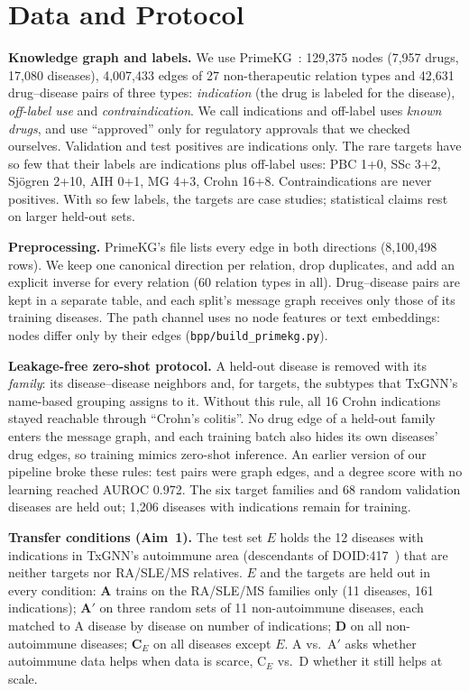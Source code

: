 \documentclass[conference]{IEEEtran}
\begin{document}
\section{Data and Protocol}
\textbf{Knowledge graph and labels.} We use PrimeKG~\cite{chandak2023primekg}: 129,375 nodes (7,957 drugs, 17,080 diseases), 4,007,433 edges of 27 non-therapeutic relation types and 42,631 drug--disease pairs of three types: \emph{indication} (the drug is labeled for the disease), \emph{off-label use} and \emph{contraindication}. We call indications and off-label uses \emph{known drugs}, and use ``approved'' only for regulatory approvals that we checked ourselves. Validation and test positives are indications only. The rare targets have so few that their labels are indications plus off-label uses: PBC 1+0, SSc 3+2, Sj\"ogren 2+10, AIH 0+1, MG 4+3, Crohn 16+8. Contraindications are never positives. With so few labels, the targets are case studies; statistical claims rest on larger held-out sets.

\textbf{Preprocessing.} PrimeKG's file lists every edge in both directions (8,100,498 rows). We keep one canonical direction per relation, drop duplicates, and add an explicit inverse for every relation (60 relation types in all). Drug--disease pairs are kept in a separate table, and each split's message graph receives only those of its training diseases. The path channel uses no node features or text embeddings: nodes differ only by their edges (\texttt{bpp/build\_primekg.py}).

\textbf{Leakage-free zero-shot protocol.} A held-out disease is removed with its \emph{family}: its disease--disease neighbors and, for targets, the subtypes that TxGNN's name-based grouping assigns to it. Without this rule, all 16 Crohn indications stayed reachable through ``Crohn's colitis''. No drug edge of a held-out family enters the message graph, and each training batch also hides its own diseases' drug edges, so training mimics zero-shot inference. An earlier version of our pipeline broke these rules: test pairs were graph edges, and a degree score with no learning reached AUROC 0.972. The six target families and 68 random validation diseases are held out; 1,206 diseases with indications remain for training.

\textbf{Transfer conditions (Aim~1).} The test set $E$ holds the 12 diseases with indications in TxGNN's autoimmune area (descendants of DOID:417~\cite{huang2024txgnn}) that are neither targets nor RA/SLE/MS relatives. $E$ and the targets are held out in every condition: \textbf{A} trains on the RA/SLE/MS families only (11 diseases, 161 indications); \textbf{A$'$} on three random sets of 11 non-autoimmune diseases, each matched to A disease by disease on number of indications; \textbf{D} on all \TrDNTrain{} non-autoimmune diseases; \textbf{C$_E$} on all \TrCENTrain{} diseases except $E$. A vs.\ A$'$ asks whether autoimmune data helps when data is scarce, C$_E$ vs.\ D whether it still helps at scale.
\end{document}
